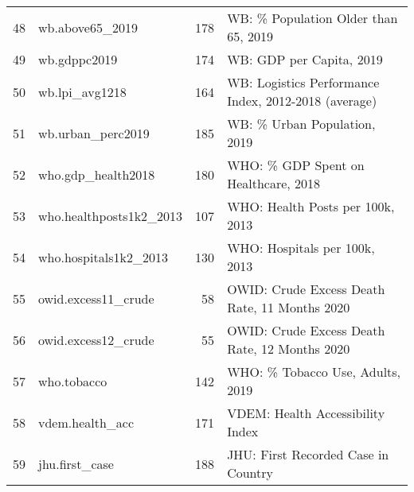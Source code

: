 \begin{longtable}{rlrl}
  48 & wb.above65\_2019 & 178 & WB: \% Population Older than 65, 2019 \\ 
  49 & wb.gdppc2019 & 174 & WB: GDP per Capita, 2019 \\ 
  50 & wb.lpi\_avg1218 & 164 & WB: Logistics Performance Index, 2012-2018 (average) \\ 
  51 & wb.urban\_perc2019 & 185 & WB: \% Urban Population, 2019 \\ 
  52 & who.gdp\_health2018 & 180 & WHO: \% GDP Spent on Healthcare, 2018 \\ 
  53 & who.healthposts1k2\_2013 & 107 & WHO: Health Posts per 100k, 2013 \\ 
  54 & who.hospitals1k2\_2013 & 130 & WHO: Hospitals per 100k, 2013 \\ 
  55 & owid.excess11\_crude & 58 & OWID: Crude Excess Death Rate, 11 Months 2020 \\ 
  56 & owid.excess12\_crude & 55 & OWID: Crude Excess Death Rate, 12 Months 2020 \\ 
  57 & who.tobacco & 142 & WHO: \% Tobacco Use, Adults, 2019 \\ 
  58 & vdem.health\_acc & 171 & VDEM: Health Accessibility Index \\ 
  59 & jhu.first\_case & 188 & JHU: First Recorded Case in Country \\ 
   \hline
\hline
\end{longtable}
\endgroup
